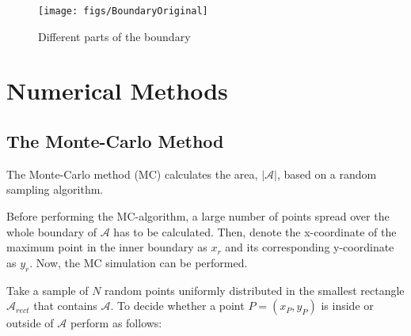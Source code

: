 \begin{figure}[!ht]
  \centering
  \texttt{[image: figs/BoundaryOriginal]}
\caption{Different parts of the boundary}
\label{fig:partsboundary}
\end{figure}

\section{Numerical Methods}

\subsection{The Monte-Carlo Method}

The Monte-Carlo method (MC) calculates the area, $|\mathcal{A}|$, based on a random sampling algorithm.



Before performing the MC-algorithm, a large number of points spread over the whole boundary of $\mathcal{A}$ has to be calculated. Then, denote the x-coordinate of the maximum point in the inner boundary as $x_r$ and its corresponding y-coordinate as $y_r$. Now, the MC simulation can be performed. 


Take a sample of $N$ random points uniformly distributed in the smallest rectangle $\mathcal{A}_{rect}$ that contains $\mathcal{A}$. To decide whether a point $P=(x_P,y_P)$ is inside or outside of $\mathcal{A}$ perform as follows:

